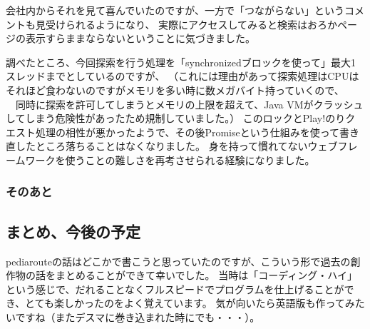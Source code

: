 会社内からそれを見て喜んでいたのですが、一方で「つながらない」というコメントも見受けられるようになり、
実際にアクセスしてみると検索はおろかページの表示すらままならないということに気づきました。

調べたところ、今回探索を行う処理を「synchronizedブロックを使って」最大1スレッドまでとしているのですが、
（これには理由があって探索処理はCPUはそれほど食わないのですがメモリを多い時に数メガバイト持っていくので、
　同時に探索を許可してしまうとメモリの上限を超えて、Java VMがクラッシュしてしまう危険性があったため規制していました。）
このロックとPlay!のりクエスト処理の相性が悪かったようで、その後Promiseという仕組みを使って書き直したところ落ちることはなくなりました。
身を持って慣れてないウェブフレームワークを使うことの難しさを再考させられる経験になりました。

\subsubsection{そのあと}


\subsection{まとめ、今後の予定}
pediarouteの話はどこかで書こうと思っていたのですが、こういう形で過去の創作物の話をまとめることができて幸いでした。
当時は「コーディング・ハイ」という感じで、だれることなくフルスピードでプログラムを仕上げることができ、とても楽しかったのをよく覚えています。
気が向いたら英語版も作ってみたいですね（またデスマに巻き込まれた時にでも・・・）。
